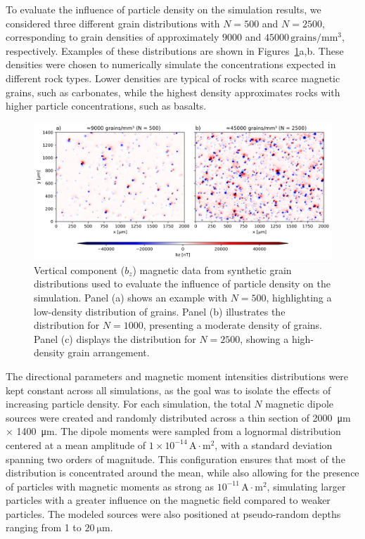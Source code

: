 To evaluate the influence of particle density on the simulation results, we considered three different grain distributions with \(N = 500\) and \(N = 2500\), corresponding to grain densities of approximately \(9000\) and \(45000\,\mathrm{grains/mm^3}\), respectively. Examples of these distributions are shown in Figures~\ref{synthetic-data-maps}a,b. These densities were chosen to numerically simulate the concentrations expected in different rock types. Lower densities are typical of rocks with scarce magnetic grains, such as carbonates, while the highest density approximates rocks with higher particle concentrations, such as basalts.

\begin{figure}[tb!]
  \centering
  \includegraphics[width=1.0\linewidth]{micromag-interfering-sources/figures/synthetic-different-densities-maps.png}
  \caption{
Vertical component (\(b_z\)) magnetic data from synthetic grain distributions used to evaluate the influence of particle density on the simulation. Panel (a) shows an example with \(N = 500\), highlighting a low-density distribution of grains. Panel (b) illustrates the distribution for \(N = 1000\), presenting a moderate density of grains. Panel (c) displays the distribution for \(N = 2500\), showing a high-density grain arrangement.
  }
  \label{synthetic-data-maps}
\end{figure}


The directional parameters and magnetic moment intensities distributions were kept constant across all simulations, as the goal was to isolate the effects of increasing particle density. For each simulation, the total \(N\) magnetic dipole sources were created and randomly distributed across a thin section of \qty{2000}{\um} \(\times\) \qty{1400}{\um}. The dipole moments were sampled from a lognormal distribution centered at a mean amplitude of \(1 \times 10^{-14}\,\mathrm{A \cdot m^2}\), with a standard deviation spanning two orders of magnitude. This configuration ensures that most of the distribution is concentrated around the mean, while also allowing for the presence of particles with magnetic moments as strong as \(10^{-11}\,\mathrm{A \cdot m^2}\), simulating larger particles with a greater influence on the magnetic field compared to weaker particles. The modeled sources were also positioned at pseudo-random depths ranging from 1 to \(\qty{20}{\micro\meter}\).

